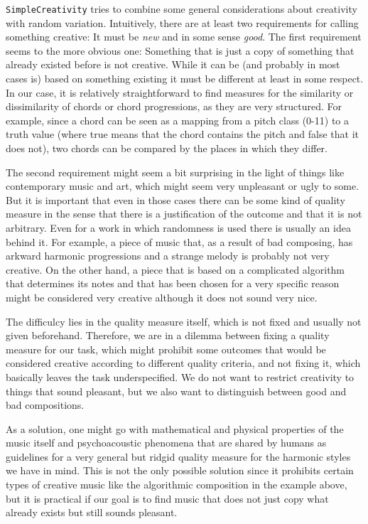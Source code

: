 \texttt{SimpleCreativity} tries to combine some general considerations about creativity with random variation.
Intuitively, there are at least two requirements for calling something creative:
It must be \emph{new} and in some sense \emph{good}.
The first requirement seems to the more obvious one:
Something that is just a copy of something that already existed before is not creative.
While it can be (and probably in most cases is) based on something existing it must be different at least in some respect.
In our case, it is relatively straightforward to find measures for the similarity or dissimilarity of chords or chord progressions, as they are very structured.
For example, since a chord can be seen as a mapping from a pitch class (0-11) to a truth value (where true means that the chord contains the pitch and false that it does not), two chords can be compared by the places in which they differ.

The second requirement might seem a bit surprising in the light of things like contemporary music and art, which might seem very unpleasant or ugly to some.
But it is important that even in those cases there can be some kind of quality measure in the sense that there is a justification of the outcome and that it is not arbitrary.
Even for a work in which randomness is used there is usually an idea behind it.
For example, a piece of music that, as a result of bad composing, has arkward harmonic progressions and a strange melody is probably not very creative.
On the other hand, a piece that is based on a complicated algorithm that determines its notes and that has been chosen for a very specific reason might be considered very creative although it does not sound very nice.

The difficulcy lies in the quality measure itself, which is not fixed and usually not given beforehand.
Therefore, we are in a dilemma between fixing a quality measure for our task, which might prohibit some outcomes that would be considered creative according to different quality criteria, and not fixing it, which basically leaves the task underspecified.
We do not want to restrict creativity to things that sound pleasant, but we also want to distinguish between good and bad compositions.

As a solution, one might go with mathematical and physical properties of the music itself and psychoacoustic phenomena that are shared by humans as guidelines for a very general but ridgid quality measure for the harmonic styles we have in mind.
This is not the only possible solution since it prohibits certain types of creative music like the algorithmic composition in the example above, but it is practical if our goal is to find music that does not just copy what already exists but still sounds pleasant.

